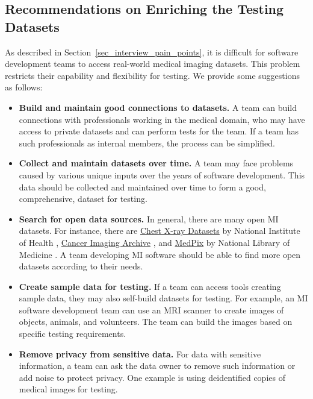 \documentclass[final, 3p, times, authoryear]{elsarticle}
\begin{document}
\subsection{Recommendations on Enriching the Testing Datasets} 
\label{sec_recommendations_testing_dataset}

As described in Section~\ref{sec_interview_pain_points}, it is difficult for
software development teams to access real-world medical imaging datasets. This
problem restricts their capability and flexibility for testing. We provide some
suggestions as follows:

\begin{itemize}
\item \textbf{Build and maintain good connections to datasets.} A team can build
connections with professionals working in the medical domain, who may have
access to private datasets and can perform tests for the team. If a team has
such professionals as internal members, the process can be simplified.

\item \textbf{Collect and maintain datasets over time.} A team may face problems
caused by various unique inputs over the years of software development. This
data should be collected and maintained over time to form a good, comprehensive,
dataset for testing.

\item \textbf{Search for open data sources.} In general, there are many open MI
datasets.  For instance, there are
\href{https://nihcc.app.box.com/v/ChestXray-NIHCC}{Chest X-ray Datasets} by
National Institute of Health \citep{WangEtAl2017},
\href{https://www.cancerimagingarchive.net/}{Cancer Imaging Archive}
\citep{PriorEtAl2017}, and \href{https://medpix.nlm.nih.gov/home}{MedPix} by
National Library of Medicine \citep{Smirniotopoulos2014}. A team developing MI
software should be able to find more open datasets according to their needs.

\item \textbf{Create sample data for testing.} If a team can access tools
creating sample data, they may also self-build datasets for testing. For
example, an MI software development team can use an MRI scanner to create images
of objects, animals, and volunteers. The team can build the images based on
specific testing requirements.

\item \textbf{Remove privacy from sensitive data.} For data with sensitive
information, a team can ask the data owner to remove such information or add
noise to protect privacy. One example is using deidentified copies of medical
images for testing.


\end{itemize}
\end{document}
